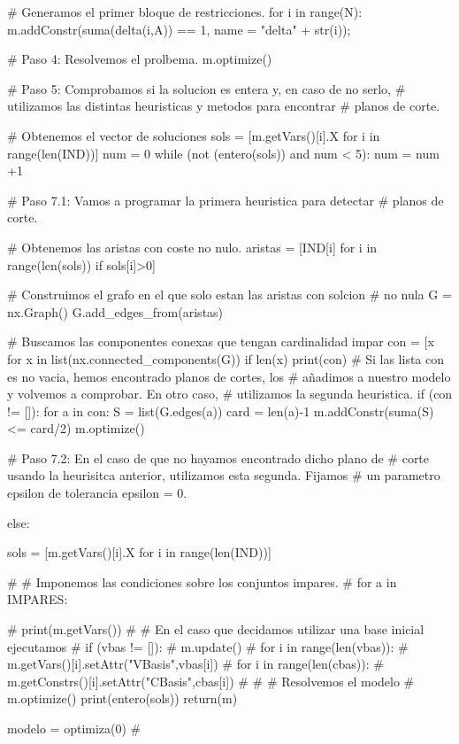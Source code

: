 \documentclass[twoside,a4paper,openright,12pt,tikz]{book}
\begin{document}
\begin{pythone}
    # Generamos el primer bloque de restricciones.
    for i in range(N):
        m.addConstr(suma(delta(i,A)) == 1, name = "delta" + str(i));
        
    # Paso 4: Resolvemos el prolbema.
    m.optimize()
    
    # Paso 5: Comprobamos si la solucion es entera y, en caso de no serlo,
    # utilizamos las distintas heuristicas y metodos para encontrar
    # planos de corte.
    
    # Obtenemos el vector de soluciones
    sols = [m.getVars()[i].X for i in range(len(IND))]
    num = 0
    while (not (entero(sols)) and num < 5):        
        num = num +1
        
        # Paso 7.1: Vamos a programar la primera heuristica para detectar 
        # planos de corte.
        
        # Obtenemos las aristas con coste no nulo.
        aristas = [IND[i] for i in range(len(sols)) if sols[i]>0]

        # Construimos el grafo en el que solo estan las aristas con solcion 
        # no nula
        G = nx.Graph()
        G.add_edges_from(aristas)
        
        # Buscamos las componentes conexas que tengan cardinalidad impar
        con = [x for x in list(nx.connected_components(G)) if len(x) %
        print(con)
        # Si las lista con es no vacia, hemos encontrado planos de cortes, los
        # añadimos a nuestro modelo y volvemos a comprobar. En otro caso, 
        # utilizamos la segunda heuristica.
        if (con != []):
            for a in con:
                S = list(G.edges(a))
                card = len(a)-1
                m.addConstr(suma(S) <= card/2) 
            m.optimize()
       
        # Paso 7.2: En el caso de que no hayamos encontrado dicho plano de
        # corte usando la heurisitca anterior, utilizamos esta segunda. Fijamos
        # un parametro epsilon de tolerancia
        epsilon = 0.

        
        
         else:
            
        
        sols = [m.getVars()[i].X for i in range(len(IND))]
        
            
        
            

    
#    # Imponemos las condiciones sobre los conjuntos impares.
#    for a in IMPARES:

#    print(m.getVars())
#    # En el caso que decidamos utilizar una base inicial ejecutamos
#    if (vbas != []):
#        m.update()
#        for i in range(len(vbas)):
#            m.getVars()[i].setAttr("VBasis",vbas[i])
#        for i in range(len(cbas)):
#            m.getConstrs()[i].setAttr("CBasis",cbas[i])
#    
#    # Resolvemos el modelo
#    m.optimize()
    print(entero(sols))
    return(m)

modelo = optimiza(0)
#    
\end{pythone}
\end{document}
